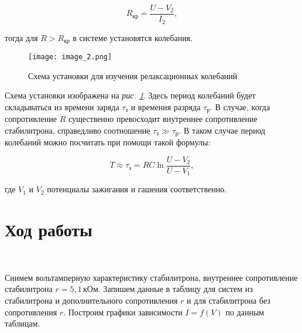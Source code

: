 \[R_{кр} = \frac{U - V_2}{I_2},\]

тогда для $R > R_{кр}$ в системе установятся колебания.

\begin{figure}[h!]
	\centering
	\texttt{[image: image\_2.png]}
	\caption{Схема установки для изучения релаксационных колебаний}
	\label{fig:image_3}
\end{figure}

Схема установки изображена на \textit{рис. \ref{fig:image_3}}. Здесь период колебаний будет складываться из времени заряда $\tau_{\textit{з}}$ и времения разряда $\tau_{\textit{р}}$. В случае, когда сопротивление $R$ существенно превосходит внутреннее сопротивление стабилитрона, справедливо соотношение $\tau_{\textit{з}} \gg \tau_{\textit{р}}$. В таком случае период колебаний можно посчитать при помощи такой формулы:

\begin{equation}
	T \approx \tau_{з} = RC\ln \frac{U - V_2}{U - V_1},
\end{equation}

где $V_1$ и $V_2$ потенциалы зажигания и гашения соответственно.

\newpage

\section*{Ход работы}\

Снимем вольтамперную характеристику стабилитрона, внутреннее сопротивление стабилитрона $r = 5,1 \, кОм$. Запишем данные в таблицу для систем из стабилитрона и дополнительного сопротивления $r$ и для стабилитрона без сопротивления $r$. Построим графики зависимости $I = f(V)$ по данным таблицам.


